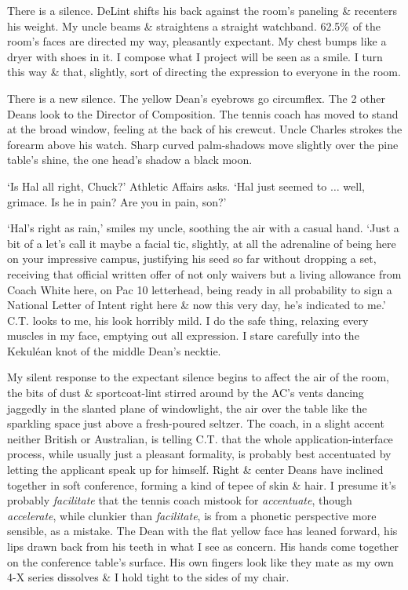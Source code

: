 \documentclass{article}
\numberwithin{equation}{section}
\begin{document}
There is a silence. DeLint shifts his back against the room's paneling \& recenters his weight. My uncle beams \& straightens a straight watchband. 62.5\% of the room's faces are directed my way, pleasantly expectant. My chest bumps like a dryer with shoes in it. I compose what I project will be seen as a smile. I turn this way \& that, slightly, sort of directing the expression to everyone in the room.

There is a new silence. The yellow Dean's eyebrows go circumflex. The 2 other Deans look to the Director of Composition. The tennis coach has moved to stand at the broad window, feeling at the back of his crewcut. Uncle Charles strokes the forearm above his watch. Sharp curved palm-shadows move slightly over the pine table's shine, the one head's shadow a black moon.

`Is Hal all right, Chuck?' Athletic Affairs asks. `Hal just seemed to $\ldots$ well, grimace. Is he in pain? Are you in pain, son?'

`Hal's right as rain,' smiles my uncle, soothing the air with a casual hand. `Just a bit of a let's call it maybe a facial tic, slightly, at all the adrenaline of being here on your impressive campus, justifying his seed so far without dropping a set, receiving that official written offer of not only waivers but a living allowance from Coach White here, on Pac 10 letterhead, being ready in all probability to sign a National Letter of Intent right here \& now this very day, he's indicated to me.' C.T. looks to me, his look horribly mild. I do the safe thing, relaxing every muscles in my face, emptying out all expression. I stare carefully into the Kekul\'ean knot of the middle Dean's necktie.

My silent response to the expectant silence begins to affect the air of the room, the bits of dust \& sportcoat-lint stirred around by the AC's vents dancing jaggedly in the slanted plane of windowlight, the air over the table like the sparkling space just above a fresh-poured seltzer. The coach, in a slight accent neither British or Australian, is telling C.T. that the whole application-interface process, while usually just a pleasant formality, is probably best accentuated by letting the applicant speak up for himself. Right \& center Deans have inclined together in soft conference, forming a kind of tepee of skin \& hair. I presume it's probably \textit{facilitate} that the tennis coach mistook for \textit{accentuate}, though \textit{accelerate}, while clunkier than \textit{facilitate}, is from a phonetic perspective more sensible, as a mistake. The Dean with the flat yellow face has leaned forward, his lips drawn back from his teeth in what I see as concern. His hands come together on the conference table's surface. His own fingers look like they mate as my own 4-X series dissolves \& I hold tight to the sides of my chair.
\end{document}
